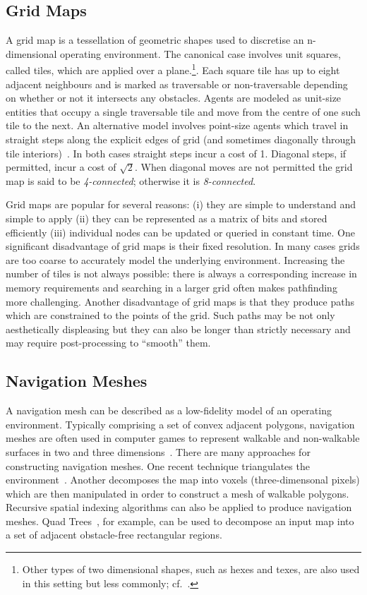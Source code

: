 \subsection{Grid Maps}
\label{cha::lit::graphs::grid}
A grid map is a tessellation of geometric shapes used to discretise an n-dimensional
operating environment. The canonical case involves unit squares, called tiles, 
which are applied over a plane.\footnote{Other types of two dimensional shapes,
such as hexes and texes, are also used in this setting but less commonly; cf.~\citep{yap02}.}.
Each square tile has up to eight adjacent neighbours and is marked 
as traversable or non-traversable depending on whether or not it
intersects any obstacles.  Agents are modeled as unit-size entities that
occupy a single traversable tile and move from the centre of one such tile 
to the next.  
An alternative model involves point-size agents which travel in straight 
steps along the explicit edges of grid (and sometimes diagonally through 
tile interiors)~\citep{nash07}.
In both cases straight steps incur a cost of 1. Diagonal steps, if permitted, 
incur a cost of $\sqrt{2}$.  When diagonal moves are not permitted the grid map 
is said to be \emph{4-connected}; otherwise it is \emph{8-connected}.  

Grid maps are popular for several reasons: (i) they are simple to understand 
and simple to apply (ii) they can be represented as a matrix of bits and stored
efficiently (iii) individual nodes can be updated or queried in constant time.
One significant disadvantage of grid maps is their fixed resolution. In many cases 
grids are too coarse to accurately model the underlying environment. Increasing the
number of tiles is not always possible: there is always a corresponding increase in
memory requirements and searching in a larger grid often makes pathfinding more 
challenging.
Another disadvantage of grid maps is that they produce paths which are
constrained to the points of the grid. Such paths may be not only aesthetically
displeasing but they can also be longer than strictly necessary and may
require post-processing to ``smooth'' them.

\subsection{Navigation Meshes}
\label{cha::lit::graphs::nav}
A navigation mesh can be described as a low-fidelity model of an operating
environment.  Typically comprising a set of convex adjacent polygons,
navigation meshes are often used in computer games to represent walkable and
non-walkable surfaces in two and three dimensions~\citep{snook00,tozour02}.
There are many approaches for constructing navigation meshes.  One recent
technique triangulates the environment~\citep{demyen07,kallmann10}.  Another
decomposes the map into voxels (three-dimensonal pixels) which are then
manipulated in order to construct a mesh of walkable polygons.  Recursive
spatial indexing algorithms can also be applied to produce navigation meshes.
Quad Trees~\citep{finkel74,samet85}, for example, can be used to decompose an
input map into a set of adjacent obstacle-free rectangular regions.

